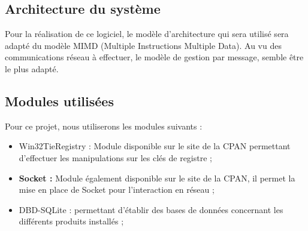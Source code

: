 \documentclass[11pt]{article}
\begin{document}
\subsection{Architecture du système}
Pour la réalisation de ce logiciel, le modèle d'architecture qui sera utilisé sera adapté du modèle MIMD (Multiple Instructions Multiple Data). Au vu des communications réseau à effectuer, le modèle de gestion par message, semble être le plus adapté.
\subsection{Modules utilisées}
Pour ce projet, nous utiliserons les modules suivants :

\begin{itemize}
     \item Win32TieRegistry : Module disponible sur le site de la CPAN permettant d'effectuer les manipulations sur les clés de registre ; 
     \item \textbf{Socket :} Module également disponible sur le site de la CPAN, il permet la mise en place de Socket pour l'interaction en réseau ;
     \item DBD-SQLite : permettant d'établir des bases de données concernant les différents produits installés ;
  \end{itemize}
\end{document}
